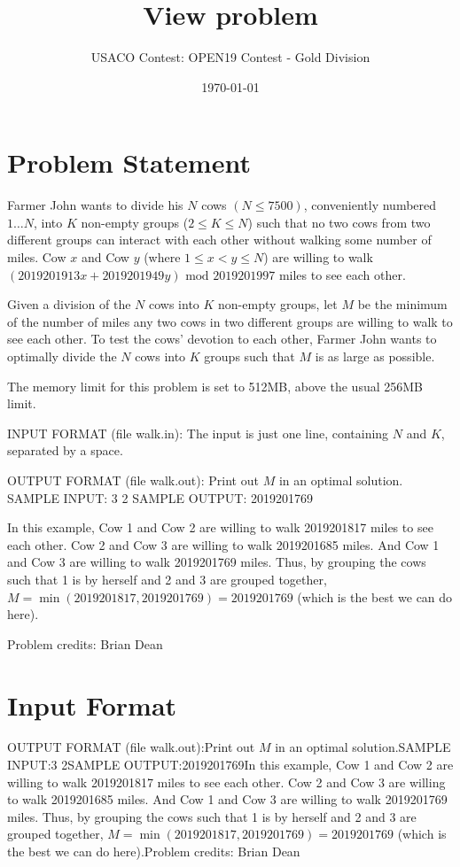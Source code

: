\documentclass[12pt]{article}
\title{View problem}
\author{USACO Contest: OPEN19 Contest - Gold Division}
\date{\today}
\begin{document}
\maketitle

\section*{Problem Statement}

Farmer John wants to divide his $N$ cows $(N \leq 7500)$, conveniently 
numbered $1 \ldots N$, into $K$ non-empty
groups ($2 \leq K \leq N$) such that no two cows from two different groups can
interact with each other without walking some number of miles.  Cow $x$ and Cow $y$ (where
$1 \leq x < y \leq N$) are willing to walk
$(2019201913x + 2019201949y)\text{ mod } 2019201997$ miles to see each other. 

Given a division of the $N$ cows into $K$ non-empty groups, let $M$ be the
minimum of the number of miles any two cows in two different groups are willing
to walk to see each other.   To test the cows' devotion to each other, Farmer
John wants to optimally divide the $N$ cows into $K$ groups such that $M$ is as
large as possible. 

The memory limit for this problem is set to 512MB, above
the usual 256MB limit.

INPUT FORMAT (file walk.in):
The input is just one line, containing $N$ and $K$, separated by a space.

OUTPUT FORMAT (file walk.out):
Print out $M$ in an optimal solution. 
SAMPLE INPUT:
3 2
SAMPLE OUTPUT: 
2019201769

In this example, Cow 1 and Cow 2 are willing to walk 2019201817 miles to see
each other.  Cow 2 and Cow 3 are willing to walk 2019201685 miles. And Cow 1 and
Cow 3 are  willing to walk 2019201769 miles. Thus, by grouping the cows such
that  1 is by herself and 2 and 3 are grouped together,
$M = \min(2019201817,2019201769) = 2019201769$ (which is the best we can do
here).


Problem credits: Brian Dean



\section*{Input Format}
OUTPUT FORMAT (file walk.out):Print out $M$ in an optimal solution.SAMPLE INPUT:3 2SAMPLE OUTPUT:2019201769In this example, Cow 1 and Cow 2 are willing to walk 2019201817 miles to see
each other.  Cow 2 and Cow 3 are willing to walk 2019201685 miles. And Cow 1 and
Cow 3 are  willing to walk 2019201769 miles. Thus, by grouping the cows such
that  1 is by herself and 2 and 3 are grouped together,
$M = \min(2019201817,2019201769) = 2019201769$ (which is the best we can do
here).Problem credits: Brian Dean
\end{document}
